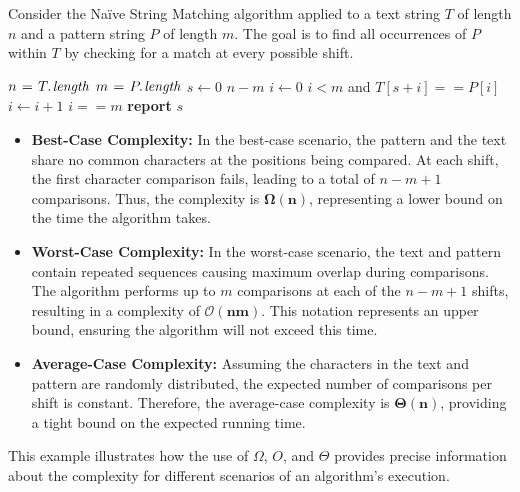 \begin{example}

    Consider the Naïve String Matching algorithm applied to a text string $T$ of length $n$ and a pattern string $P$ of length $m$. The goal is to find all occurrences of $P$ within $T$ by checking for a match at every possible shift.
    
    \begin{codebox}
        \li $n \gets \attrib{T}{length}$
        \li $m \gets \attrib{P}{length}$
        \li \For $s \gets 0$ \To $n - m$ \Do
        \li     $i \gets 0$
        \li     \While $i < m$ and $T[s + i] == P[i]$ \Do
        \li         $i \gets i + 1$
                \End
        \li     \If $i == m$ \Then
        \li         \textbf{report} $s$ 
                \End
            \End
    \end{codebox}
    
    \begin{itemize}
        \item \textbf{Best-Case Complexity: }  
        In the best-case scenario, the pattern and the text share no common characters at the positions being compared. At each shift, the first character comparison fails, leading to a total of $n - m + 1$ comparisons. Thus, the complexity is $\boldsymbol{\Omega(n)}$, representing a lower bound on the time the algorithm takes.
    
        \item \textbf{Worst-Case Complexity: }
        In the worst-case scenario, the text and pattern contain repeated sequences causing maximum overlap during comparisons. The algorithm performs up to $m$ comparisons at each of the $n - m + 1$ shifts, resulting in a complexity of $\boldsymbol{\mathcal{O}(nm)}$. This notation represents an upper bound, ensuring the algorithm will not exceed this time.
    
        \item \textbf{Average-Case Complexity: } 
        Assuming the characters in the text and pattern are randomly distributed, the expected number of comparisons per shift is constant. Therefore, the average-case complexity is $\boldsymbol{\Theta(n)}$, providing a tight bound on the expected running time.
    \end{itemize}
   
    
    This example illustrates how the use of $\Omega$, $O$, and $\Theta$ provides precise information about the complexity for different scenarios of an algorithm's execution.
    
    \end{example}

